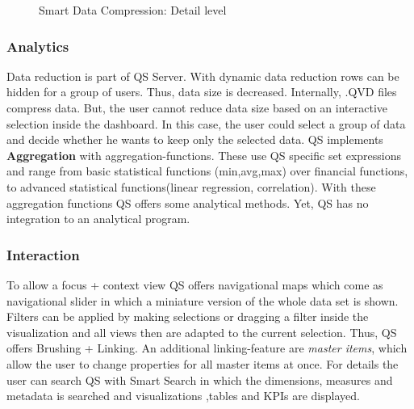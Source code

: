 \begin{figure}[H]
    \centering
    \qquad
    \caption{Smart Data Compression: Detail level}
    \label{fig:smartdatacompression}
\end{figure}

\subsubsection*{Analytics}
Data reduction is part of QS Server. With dynamic data reduction rows can be hidden for a group of users. Thus, data size is decreased. Internally, .QVD files compress data. But, the user cannot reduce data size based on an interactive selection inside the dashboard. In this case, the user could select a group of data and decide whether he wants to keep only the selected data. 
QS implements \textbf{Aggregation} with aggregation-functions. These use QS specific set expressions and range from basic statistical functions (min,avg,max) over financial functions, to advanced statistical functions(linear regression, correlation). With these aggregation functions QS offers some analytical methods. Yet, QS has no integration to an analytical program.
\subsubsection*{Interaction}
To allow a focus + context view QS offers navigational maps\cite{beard1990navigational} which come as navigational slider in which a miniature version of the whole data set\cite{beard1990navigational} is shown. 
Filters can be applied by making selections or dragging a filter inside the visualization\cite{qlikSheet}  and all views then are adapted to the current selection. Thus, QS offers Brushing + Linking. An additional linking-feature are \textit{master items}\cite{qlikChangeData}, which allow the user to change properties for all master items at once.
For details the user can search QS with Smart Search in which the dimensions, measures and metadata is searched and visualizations ,tables and KPIs are displayed\cite{qlikSmart}.  


